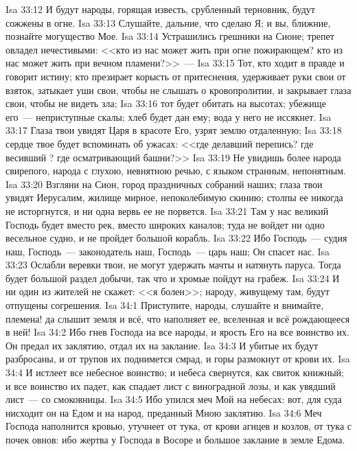 \vs Isa 33:12 И будут народы,  горящая известь,  срубленный терновник, будут сожжены в огне.
\rsbpar\vs Isa 33:13 Слушайте, дальние, что сделаю Я; и вы, ближние, познайте могущество Мое.
\vs Isa 33:14 Устрашились грешники на Сионе; трепет овладел нечестивыми: <<кто из нас может жить при огне пожирающем? кто из нас может жить при вечном пламени?>>~---
\vs Isa 33:15 Тот, кто ходит в правде и говорит истину; кто презирает корысть от притеснения, удерживает руки свои от взяток, затыкает уши свои, чтобы не слышать о кровопролитии, и закрывает глаза свои, чтобы не видеть зла;
\vs Isa 33:16 тот будет обитать на высотах; убежище его~--- неприступные скалы; хлеб будет дан ему; вода у него не иссякнет.
\vs Isa 33:17 Глаза твои увидят Царя в красоте Его, узрят землю отдаленную;
\vs Isa 33:18 сердце твое будет  вспоминать об ужасах: <<где делавший перепись? где весивший ? где осматривающий башни?>>
\vs Isa 33:19 Не увидишь более народа свирепого, народа с глухою, невнятною речью, с языком странным, непонятным.
\vs Isa 33:20 Взгляни на Сион, город праздничных собраний наших; глаза твои увидят Иерусалим, жилище мирное, непоколебимую скинию; столпы ее никогда не исторгнутся, и ни одна вервь ее не порвется.
\vs Isa 33:21 Там у нас великий Господь будет вместо рек, вместо широких каналов; туда не войдет ни одно весельное судно, и не пройдет большой корабль.
\vs Isa 33:22 Ибо Господь~--- судия наш, Господь~--- законодатель наш, Господь~--- царь наш; Он спасет нас.
\vs Isa 33:23 Ослабли веревки твои, не могут удержать мачты и натянуть паруса. Тогда будет большой раздел добычи, так что и хромые пойдут на грабеж.
\vs Isa 33:24 И ни один из жителей не скажет: <<я болен>>; народу, живущему там, будут отпущены согрешения.
\vs Isa 34:1 Приступите, народы, слушайте и внимайте, племена! да слышит земля и всё, что наполняет ее, вселенная и всё рождающееся в ней!
\vs Isa 34:2 Ибо гнев Господа на все народы, и ярость Его на все воинство их. Он предал их заклятию, отдал их на заклание.
\vs Isa 34:3 И убитые их будут разбросаны, и от трупов их поднимется смрад, и горы размокнут от крови их.
\vs Isa 34:4 И истлеет все небесное воинство; и небеса свернутся, как свиток книжный; и все воинство их падет, как спадает лист с виноградной лозы, и как увядший лист~--- со смоковницы.
\vs Isa 34:5 Ибо упился меч Мой на небесах: вот, для суда нисходит он на Едом и на народ, преданный Мною заклятию.
\vs Isa 34:6 Меч Господа наполнится кровью, утучнеет от тука, от крови агнцев и козлов, от тука с почек овнов: ибо жертва у Господа в Восоре и большое заклание в земле Едома.
